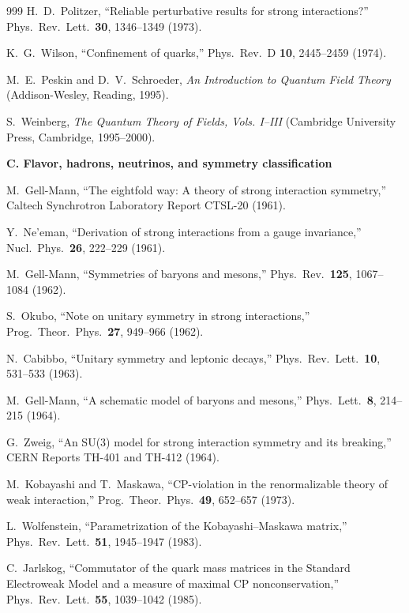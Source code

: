 \begin{thebibliography}{999}
H.~D.~Politzer,
``Reliable perturbative results for strong interactions?''
Phys.\ Rev.\ Lett.\ \textbf{30}, 1346--1349 (1973).

K.~G.~Wilson,
``Confinement of quarks,'' Phys.\ Rev.\ D \textbf{10}, 2445--2459 (1974).

M.~E.~Peskin and D.~V.~Schroeder,
\emph{An Introduction to Quantum Field Theory}
(Addison-Wesley, Reading, 1995).

S.~Weinberg,
\emph{The Quantum Theory of Fields, Vols. I--III}
(Cambridge University Press, Cambridge, 1995--2000).

\item[]\textbf{C. Flavor, hadrons, neutrinos, and symmetry classification}

M.~Gell-Mann,
``The eightfold way: A theory of strong interaction symmetry,''
Caltech Synchrotron Laboratory Report CTSL-20 (1961).

Y.~Ne'eman,
``Derivation of strong interactions from a gauge invariance,''
Nucl.\ Phys.\ \textbf{26}, 222--229 (1961).

M.~Gell-Mann,
``Symmetries of baryons and mesons,''
Phys.\ Rev.\ \textbf{125}, 1067--1084 (1962).

S.~Okubo,
``Note on unitary symmetry in strong interactions,''
Prog.\ Theor.\ Phys.\ \textbf{27}, 949--966 (1962).

N.~Cabibbo,
``Unitary symmetry and leptonic decays,''
Phys.\ Rev.\ Lett.\ \textbf{10}, 531--533 (1963).

M.~Gell-Mann,
``A schematic model of baryons and mesons,''
Phys.\ Lett.\ \textbf{8}, 214--215 (1964).

G.~Zweig,
``An SU(3) model for strong interaction symmetry and its breaking,''
CERN Reports TH-401 and TH-412 (1964).

M.~Kobayashi and T.~Maskawa,
``CP-violation in the renormalizable theory of weak interaction,''
Prog.\ Theor.\ Phys.\ \textbf{49}, 652--657 (1973).

L.~Wolfenstein,
``Parametrization of the Kobayashi--Maskawa matrix,''
Phys.\ Rev.\ Lett.\ \textbf{51}, 1945--1947 (1983).

C.~Jarlskog,
``Commutator of the quark mass matrices in the Standard Electroweak Model and
a measure of maximal CP nonconservation,''
Phys.\ Rev.\ Lett.\ \textbf{55}, 1039--1042 (1985).


\end{thebibliography}
